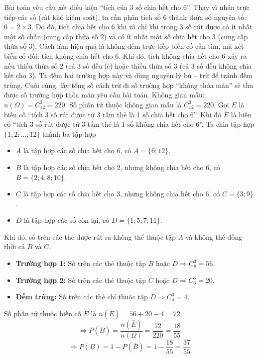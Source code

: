 \documentclass[12pt, a4paper]{article}
\begin{document}
	\vspace{0.4cm}
	\noindent Bài toán yêu cầu xét điều kiện ``tích của 3 số chia hết cho 6''. Thay vì nhân trực tiếp các số (rất khó kiểm soát), ta cần phân tích số 6 thành thừa số nguyên tố: $6 = 2 \times 3$.
	\noindent Do đó, tích chia hết cho 6 khi và chỉ khi trong 3 số rút được có ít nhất một số chẵn (cung cấp thừa số 2) và có ít nhất một số chia hết cho 3 (cung cấp thừa số 3).
	\noindent Cách làm hiệu quả là không đếm trực tiếp biến cố cần tìm, mà xét biến cố đối: tích không chia hết cho 6. Khi đó, tích không chia hết cho 6 xảy ra nếu thiếu thừa số 2 (cả 3 số đều lẻ) hoặc thiếu thừa số 3 (cả 3 số đều không chia hết cho 3). Ta đếm hai trường hợp này và dùng nguyên lý bù -- trừ để tránh đếm trùng. Cuối cùng, lấy tổng số cách trừ đi số trường hợp ``không thỏa mãn'' sẽ thu được số trường hợp thỏa mãn yêu cầu bài toán.
	\vspace{0.3cm}
	\vspace{0.2cm}
	\noindent Không gian mẫu: $n(\Omega) = C_{12}^3 = 220$.
	\noindent Số phần tử thuộc không gian mẫu là $C_{12}^3 = 220$.
	\noindent Gọi $E$ là biến cố ``tích 3 số rút được từ 3 tấm thẻ là 1 số chia hết cho 6''.
	\noindent Khi đó $\bar{E}$ là biến cố ``tích 3 số rút được từ 3 tấm thẻ là 1 số không chia hết cho 6''.
	\noindent Ta chia tập hợp $\{1; 2; \ldots; 12\}$ thành ba tập hợp
	\begin{itemize}[leftmargin=*]
		\item $A$ là tập hợp các số chia hết cho 6, có $A = \{6; 12\}$.
		\item $B$ là tập hợp các số chia hết cho 2, nhưng không chia hết cho 6, có $B = \{2; 4; 8; 10\}$.
		\item $C$ là tập hợp các số chia hết cho 3, nhưng không chia hết cho 6, có $C = \{3; 9\}$.
		\item $D$ là tập hợp các số còn lại, có $D = \{1; 5; 7; 11\}$.
	\end{itemize}
	
	\noindent Khi đó, số trên các thẻ được rút ra không thể thuộc tập $A$ và không thể đồng thời cả $B$ và $C$.
	\begin{itemize}[leftmargin=*]
		\item \textbf{Trường hợp 1:} Số trên các thẻ thuộc tập $B$ hoặc $D \Rightarrow C_8^3 = 56$.
		\item \textbf{Trường hợp 2:} Số trên các thẻ thuộc tập $C$ hoặc $D \Rightarrow C_6^3 = 20$.
	\end{itemize}
	\begin{itemize}[leftmargin=*]
		\item \textbf{Đếm trùng:} Số trên các thẻ chỉ thuộc tập $D \Rightarrow C_4^3 = 4$.
	\end{itemize}
	Số phần tử thuộc biến cố $\bar{E}$ là $n(\bar{E}) = 56 + 20 - 4 = 72$.
	\[
	\Rightarrow P(\bar{B}) = \frac{n(\bar{E})}{n(\Omega)} = \frac{72}{220} = \frac{18}{55}
	\]
	\[
	\Rightarrow P(B) = 1 - P(\bar{B}) = 1 - \frac{18}{55} = \boxed{\frac{37}{55}}
	\]
	
\end{document}
